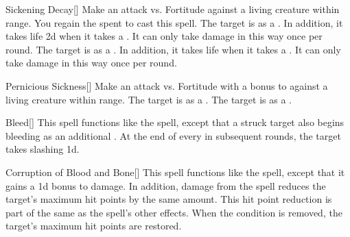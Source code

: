\lowercase{\hypertarget{spell:Sickening Decay}{}}\label{spell:Sickening Decay}
\begin{apability}[\nth{1}]{\hypertarget{spell:Sickening Decay}{Sickening Decay}}[]
Make an attack vs. Fortitude against a living creature within \rngclose range.
\miss You regain the  spent to cast this spell.
\hit The target is  as a .
In addition, it takes life  \minus2d when it takes a .
It can only take damage in this way once per round.
\crit The target is  as a .
In addition, it takes life  when it takes a .
It can only take damage in this way once per round.
\end{apability}
\vspace{0.25em}



\lowercase{\hypertarget{spell:Pernicious Sickness}{}}\label{spell:Pernicious Sickness}
\begin{apability}[\nth{2}]{\hypertarget{spell:Pernicious Sickness}{Pernicious Sickness}}[]
Make an attack vs. Fortitude with a  bonus to  against a living creature within \rngmed range.
\hit The target is  as a .
\crit The target is  as a .
\end{apability}
\vspace{0.25em}



\lowercase{\hypertarget{spell:Bleed}{}}\label{spell:Bleed}
\begin{apability}[\nth{3}]{\hypertarget{spell:Bleed}{Bleed}}[]
This spell functions like the  spell, except that a struck target also begins bleeding as an additional .
At the end of every  in subsequent rounds, the target takes slashing  \minus1d.
\end{apability}
\vspace{0.25em}



\lowercase{\hypertarget{spell:Corruption of Blood and Bone}{}}\label{spell:Corruption of Blood and Bone}
\begin{apability}[\nth{3}]{\hypertarget{spell:Corruption of Blood and Bone}{Corruption of Blood and Bone}}[]
This spell functions like the  spell, except that it gains a \plus1d bonus to damage.
In addition, damage from the spell reduces the target's maximum hit points by the same amount.
This hit point reduction is part of the same  as the spell's other effects.
When the condition is removed, the target's maximum hit points are restored.
\end{apability}
\vspace{0.25em}



